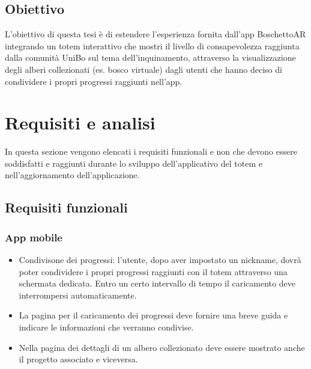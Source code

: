 \subsection{Obiettivo}
L'obiettivo di questa tesi è di estendere l'esperienza fornita dall'app BoschettoAR integrando un totem interattivo che mostri il livello di consapevolezza raggiunta dalla comunità UniBo sul tema dell'inquinamento, attraverso la visualizzazione degli alberi collezionati (es. bosco virtuale) dagli utenti che hanno deciso di condividere i propri progressi raggiunti nell'app.

\section{Requisiti e analisi}
In questa sezione vengono elencati i requisiti funzionali e non che devono essere soddisfatti e raggiunti durante lo sviluppo dell'applicativo del totem e nell'aggiornamento dell'applicazione.
\subsection{Requisiti funzionali}
\subsubsection{App mobile}
\begin{itemize}
    \item Condivisone dei progressi: l'utente, dopo aver impostato un nickname, dovrà poter condividere i propri progressi raggiunti con il totem attraverso una schermata dedicata. Entro un certo intervallo di tempo il caricamento deve interrompersi automaticamente.
    \item La pagina per il caricamento dei progressi deve fornire una breve guida e indicare le informazioni che verranno condivise.
    \item Nella pagina dei dettagli di un albero collezionato deve essere mostrato anche il progetto associato e viceversa.
\end{itemize}
